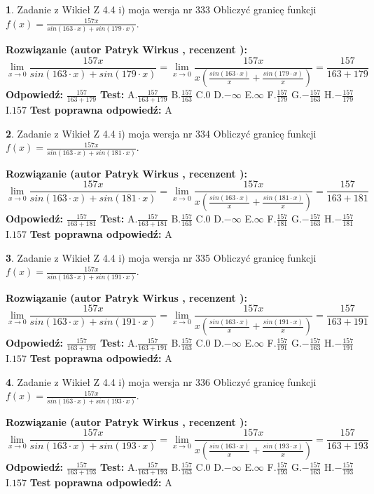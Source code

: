 \documentclass[12pt, a4paper]{article}
\theoremstyle{definition} %
\newtheorem{zad}{}
\newcommand{\zadStart}[1]{\begin{zad}#1\newline}
\newcommand{\zadStop}{\end{zad}}
\newcommand{\rozwStart}[2]{\noindent \textbf{Rozwiązanie (autor #1 , recenzent #2): }\newline}
\newcommand{\rozwStop}{\newline}
\newcommand{\odpStart}{\noindent \textbf{Odpowiedź:}\newline}
\newcommand{\odpStop}{\newline}
\newcommand{\testStart}{\noindent \textbf{Test:}\newline}
\newcommand{\testStop}{\newline}
\newcommand{\kluczStart}{\noindent \textbf{Test poprawna odpowiedź:}\newline}
\newcommand{\kluczStop}{\newline}
\begin{document}
\zadStart{Zadanie z Wikieł Z 4.4 i) moja wersja nr 333}
Obliczyć granicę funkcji $f(x)=\frac{157x}{sin(163\cdot x) +sin(179\cdot x)}$.
\zadStop
\rozwStart{Patryk Wirkus}{}
$$\lim\limits_{x\to 0}\frac{157x}{sin(163\cdot x) +sin(179\cdot x)}=\lim\limits_{x\to 0}\frac{157x}{x(\frac{sin(163\cdot x)}{x}+\frac{sin(179\cdot x)}{x})}=\frac{157}{163+179}$$
\rozwStop
\odpStart
$\frac{157}{163+179}$
\odpStop
\testStart
A.$\frac{157}{163+179}$
B.$\frac{157}{163}$
C.$0$
D.$-\infty$
E.$\infty$
F.$\frac{157}{179}$
G.$-\frac{157}{163}$
H.$-\frac{157}{179}$
I.$157$
\testStop
\kluczStart
A
\kluczStop



\zadStart{Zadanie z Wikieł Z 4.4 i) moja wersja nr 334}
Obliczyć granicę funkcji $f(x)=\frac{157x}{sin(163\cdot x) +sin(181\cdot x)}$.
\zadStop
\rozwStart{Patryk Wirkus}{}
$$\lim\limits_{x\to 0}\frac{157x}{sin(163\cdot x) +sin(181\cdot x)}=\lim\limits_{x\to 0}\frac{157x}{x(\frac{sin(163\cdot x)}{x}+\frac{sin(181\cdot x)}{x})}=\frac{157}{163+181}$$
\rozwStop
\odpStart
$\frac{157}{163+181}$
\odpStop
\testStart
A.$\frac{157}{163+181}$
B.$\frac{157}{163}$
C.$0$
D.$-\infty$
E.$\infty$
F.$\frac{157}{181}$
G.$-\frac{157}{163}$
H.$-\frac{157}{181}$
I.$157$
\testStop
\kluczStart
A
\kluczStop



\zadStart{Zadanie z Wikieł Z 4.4 i) moja wersja nr 335}
Obliczyć granicę funkcji $f(x)=\frac{157x}{sin(163\cdot x) +sin(191\cdot x)}$.
\zadStop
\rozwStart{Patryk Wirkus}{}
$$\lim\limits_{x\to 0}\frac{157x}{sin(163\cdot x) +sin(191\cdot x)}=\lim\limits_{x\to 0}\frac{157x}{x(\frac{sin(163\cdot x)}{x}+\frac{sin(191\cdot x)}{x})}=\frac{157}{163+191}$$
\rozwStop
\odpStart
$\frac{157}{163+191}$
\odpStop
\testStart
A.$\frac{157}{163+191}$
B.$\frac{157}{163}$
C.$0$
D.$-\infty$
E.$\infty$
F.$\frac{157}{191}$
G.$-\frac{157}{163}$
H.$-\frac{157}{191}$
I.$157$
\testStop
\kluczStart
A
\kluczStop



\zadStart{Zadanie z Wikieł Z 4.4 i) moja wersja nr 336}
Obliczyć granicę funkcji $f(x)=\frac{157x}{sin(163\cdot x) +sin(193\cdot x)}$.
\zadStop
\rozwStart{Patryk Wirkus}{}
$$\lim\limits_{x\to 0}\frac{157x}{sin(163\cdot x) +sin(193\cdot x)}=\lim\limits_{x\to 0}\frac{157x}{x(\frac{sin(163\cdot x)}{x}+\frac{sin(193\cdot x)}{x})}=\frac{157}{163+193}$$
\rozwStop
\odpStart
$\frac{157}{163+193}$
\odpStop
\testStart
A.$\frac{157}{163+193}$
B.$\frac{157}{163}$
C.$0$
D.$-\infty$
E.$\infty$
F.$\frac{157}{193}$
G.$-\frac{157}{163}$
H.$-\frac{157}{193}$
I.$157$
\testStop
\kluczStart
A
\kluczStop
\end{document}
